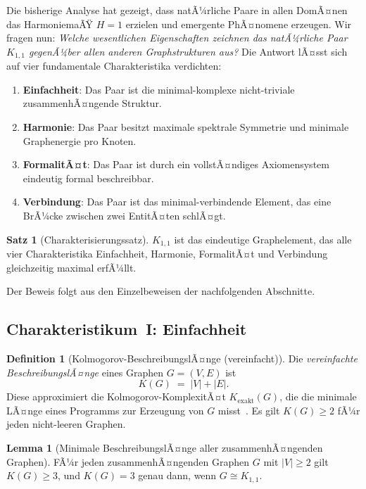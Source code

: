 ﻿\documentclass[a4paper,12pt]{article}
\theoremstyle{definition}
\newtheorem{definition}{Definition}
\newtheorem{satz}{Satz}
\newtheorem{lemma}{Lemma}
\begin{document}
Die bisherige Analyse hat gezeigt, dass natÃ¼rliche Paare in allen DomÃ¤nen das
HarmoniemaÃŸ $H = 1$ erzielen und emergente PhÃ¤nomene erzeugen.
Wir fragen nun: \emph{Welche wesentlichen Eigenschaften zeichnen das natÃ¼rliche
Paar $K_{1,1}$ gegenÃ¼ber allen anderen Graphstrukturen aus?}
Die Antwort lÃ¤sst sich auf vier fundamentale Charakteristika verdichten:
\begin{enumerate}
	\item \textbf{Einfachheit}: Das Paar ist die minimal-komplexe nicht-triviale
	zusammenhÃ¤ngende Struktur.
	\item \textbf{Harmonie}: Das Paar besitzt maximale spektrale Symmetrie und
	minimale Graphenergie pro Knoten.
	\item \textbf{FormalitÃ¤t}: Das Paar ist durch ein vollstÃ¤ndiges Axiomensystem
	eindeutig formal beschreibbar.
	\item \textbf{Verbindung}: Das Paar ist das minimal-verbindende Element,
	das eine BrÃ¼cke zwischen zwei EntitÃ¤ten schlÃ¤gt.
\end{enumerate}

\begin{satz}[Charakterisierungssatz]
	\label{satz:charakt}
	$K_{1,1}$ ist das eindeutige Graphelement, das alle vier Charakteristika
	Einfachheit, Harmonie, FormalitÃ¤t und Verbindung gleichzeitig maximal erfÃ¼llt.
\end{satz}

Der Beweis folgt aus den Einzelbeweisen der nachfolgenden Abschnitte.

\subsection{Charakteristikum~I: Einfachheit}
\label{subsec:einfachheit}

\begin{definition}[Kolmogorov-BeschreibungslÃ¤nge (vereinfacht)]
	\label{def:kolmogorov}
	Die \emph{vereinfachte BeschreibungslÃ¤nge} eines Graphen $G = (V, E)$ ist
	\[
		K(G) \;=\; |V| + |E|.
	\]
	Diese approximiert die Kolmogorov-KomplexitÃ¤t $K_{\mathrm{exakt}}(G)$,
	die die minimale LÃ¤nge eines Programms zur Erzeugung von $G$ misst~\cite{kolmogorov1965}.
	Es gilt $K(G) \geq 2$ fÃ¼r jeden nicht-leeren Graphen.
\end{definition}

\begin{lemma}[Minimale BeschreibungslÃ¤nge aller zusammenhÃ¤ngenden Graphen]
	\label{lem:minK}
	FÃ¼r jeden zusammenhÃ¤ngenden Graphen $G$ mit $|V| \geq 2$ gilt
	$K(G) \geq 3$, und $K(G) = 3$ genau dann, wenn $G \cong K_{1,1}$.
\end{lemma}
\end{document}

